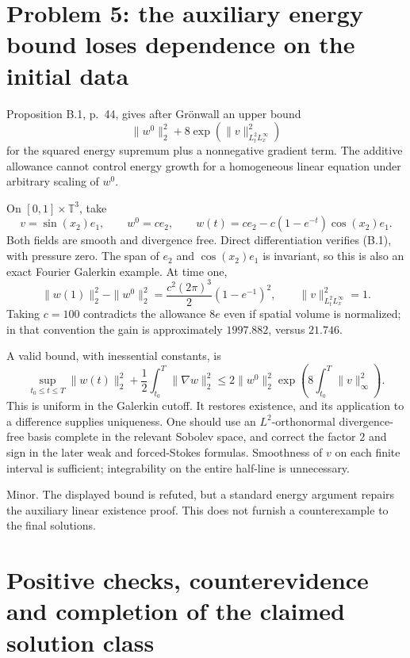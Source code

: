 \documentclass[10pt]{article}
\begin{document}
\section*{Problem 5: the auxiliary energy bound loses dependence on the initial data}
Proposition B.1, p. 44, gives after Grönwall an upper bound \[\|w^0\|_2^2+8\exp\!\left(\|v\|_{L^2_tL^\infty_x}^2\right)\] for the squared energy supremum plus a nonnegative gradient term. The additive allowance cannot control energy growth for a homogeneous linear equation under arbitrary scaling of \(w^0\).\par
On \([0,1]\times\mathbb T^3\), take \[v=\sin(x_2)e_1,\qquad
 w^0=c e_2,\qquad
 w(t)=c e_2-c(1-e^{-t})\cos(x_2)e_1.\] Both fields are smooth and divergence free. Direct differentiation verifies (B.1), with pressure zero. The span of \(e_2\) and \(\cos(x_2)e_1\) is invariant, so this is also an exact Fourier Galerkin example. At time one, \[\|w(1)\|_2^2-\|w^0\|_2^2
 =\frac{c^2(2\pi)^3}{2}(1-e^{-1})^2,
 \qquad \|v\|_{L^2_tL^\infty_x}^2=1.\] Taking \(c=100\) contradicts the allowance \(8e\) even if spatial volume is normalized; in that convention the gain is approximately \(1997.882\), versus \(21.746\).\par
A valid bound, with inessential constants, is \[\sup_{t_0\leq t\leq T}\|w(t)\|_2^2
       +\frac12\int_{t_0}^T\|\nabla w\|_2^2
 \leq2\|w^0\|_2^2
       \exp\!\left(8\int_{t_0}^T\|v\|_\infty^2\right).\] This is uniform in the Galerkin cutoff. It restores existence, and its application to a difference supplies uniqueness. One should use an \(L^2\)-orthonormal divergence-free basis complete in the relevant Sobolev space, and correct the factor \(2\) and sign in the later weak and forced-Stokes formulas. Smoothness of \(v\) on each finite interval is sufficient; integrability on the entire half-line is unnecessary.\par
Minor. The displayed bound is refuted, but a standard energy argument repairs the auxiliary linear existence proof. This does not furnish a counterexample to the final solutions.\par
\section*{Positive checks, counterevidence and completion of the claimed solution class}
\end{document}
